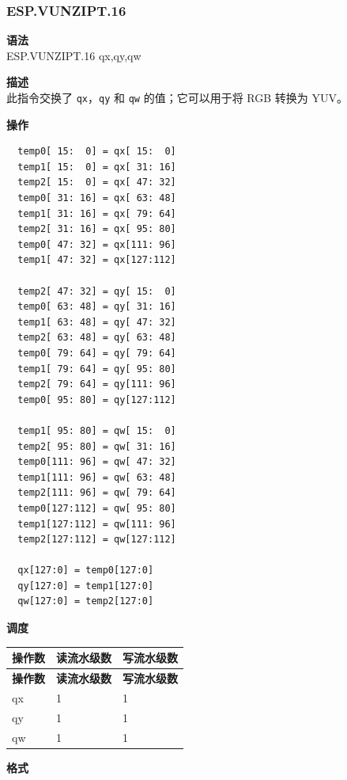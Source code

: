 \newpage

\newpage
\subsubsection{ESP.VUNZIPT.16}\label{instruction:ESPVUNZIPT16}
\textbf{语法}\\
ESP.VUNZIPT.16 qx,qy,qw

\textbf{描述}\\
此指令交换了 \lstinline{qx}，\lstinline{qy} 和 \lstinline{qw} 的值；它可以用于将 RGB 转换为 YUV。

\textbf{操作}\\
\begin{lstlisting}
  temp0[ 15:  0] = qx[ 15:  0]
  temp1[ 15:  0] = qx[ 31: 16]
  temp2[ 15:  0] = qx[ 47: 32]
  temp0[ 31: 16] = qx[ 63: 48]
  temp1[ 31: 16] = qx[ 79: 64]
  temp2[ 31: 16] = qx[ 95: 80]
  temp0[ 47: 32] = qx[111: 96]
  temp1[ 47: 32] = qx[127:112]

  temp2[ 47: 32] = qy[ 15:  0]
  temp0[ 63: 48] = qy[ 31: 16]
  temp1[ 63: 48] = qy[ 47: 32]
  temp2[ 63: 48] = qy[ 63: 48]
  temp0[ 79: 64] = qy[ 79: 64]
  temp1[ 79: 64] = qy[ 95: 80]
  temp2[ 79: 64] = qy[111: 96]
  temp0[ 95: 80] = qy[127:112]

  temp1[ 95: 80] = qw[ 15:  0]
  temp2[ 95: 80] = qw[ 31: 16]
  temp0[111: 96] = qw[ 47: 32]
  temp1[111: 96] = qw[ 63: 48]
  temp2[111: 96] = qw[ 79: 64]
  temp0[127:112] = qw[ 95: 80]
  temp1[127:112] = qw[111: 96]
  temp2[127:112] = qw[127:112]

  qx[127:0] = temp0[127:0]
  qy[127:0] = temp1[127:0]
  qw[127:0] = temp2[127:0]

\end{lstlisting}

\textbf{调度}\\
\begin{longtable}[c]{|l|l|l|}
    \hline
    \rowcolor{lightgray}
    \textbf{操作数} & \textbf{读流水级数} & \textbf{写流水级数} \\\hline
    \endfirsthead
    \hline
    \rowcolor{lightgray}
     \textbf{操作数} & \textbf{读流水级数} & \textbf{写流水级数} \\\hline
    \endhead
    \hline
    \endfoot

  qx & 1 & 1 \\\hline
  qy & 1 & 1 \\\hline
  qw & 1 & 1

\end{longtable}

\textbf{格式}\\

